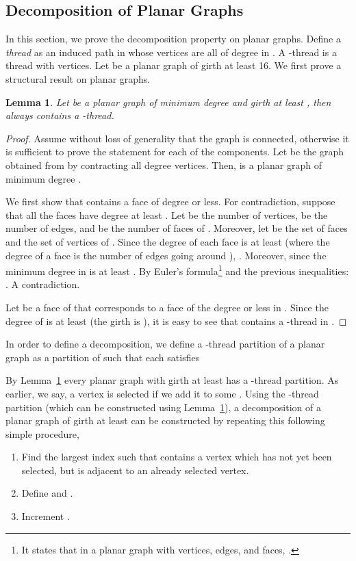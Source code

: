 \documentclass[11pt]{article}
\newtheorem{lemma}[theorem]{Lemma}
\begin{document}
\subsection{Decomposition of Planar Graphs}
In this section, we prove the decomposition property on planar graphs. Define a \emph{thread} as an induced path in  whose vertices are all of degree  in . A -thread is a thread with  vertices. Let  be a planar graph of girth at least 16. We first prove a structural result on planar graphs. 
\begin{lemma} \label{planare}
Let  be a planar graph of minimum degree  and girth at least , then  always contains a -thread. 
\end{lemma}
\begin{proof}
Assume without loss of generality that the graph  is connected, otherwise it is sufficient to prove the statement for each of the components. Let  be the graph obtained from  by contracting all degree  vertices. Then,  is a planar graph of minimum degree . 

We first show that  contains a face of degree  or less. For contradiction, suppose that all the faces have degree at least . Let  be the number of vertices,  be the number of edges, and  be the number of faces of . Moreover, let  be the set of faces and  the set of vertices of . Since the degree of each face is at least  (where the degree of a face  is the number of edges going around ), . Moreover,  since the minimum degree in  is at least .
By Euler's formula\footnote{It states that in a planar graph with  vertices,   edges, and   faces, .}  and the previous inequalities: . A contradiction.

Let  be a face of  that corresponds to a face of the degree  or less in . Since the degree of  is at least  (the girth is ), it is easy to see that  contains a -thread in .
\end{proof}

In order to define a decomposition, we define a -thread partition  of a planar graph  as a partition of  such that each  satisfies 

By Lemma~\ref{planare} every planar graph with girth at least  has a -thread partition. As earlier, we say, a vertex is selected if we add it to some . Using the -thread partition (which can be constructed using Lemma~\ref{planare}), a decomposition of a planar graph of girth at least  can be constructed by repeating this following simple procedure,
\renewcommand{\labelenumi}{\roman{enumi}.}

\begin{enumerate}
\item Find the largest index  such that  contains a vertex  which has not yet been selected, but is adjacent to an already selected vertex. 
\item Define  and . 
\item Increment . 
\end{enumerate} 
\end{document}
